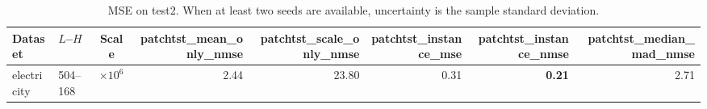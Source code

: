 \begin{table}[htbp]
\centering
\caption{MSE on test2. When at least two seeds are available, uncertainty is the sample standard deviation.}
\begin{tabular}{llcrrrrr}
\toprule
Dataset & $L$--$H$ & Scale & patchtst\_mean\_only\_nmse & patchtst\_scale\_only\_nmse & patchtst\_instance\_mse & patchtst\_instance\_nmse & patchtst\_median\_mad\_nmse \\
\midrule
electricity & 504--168 & $\times 10^{6}$ & 2.44 & 23.80 & 0.31 & \textbf{0.21} & 2.71 \\
\bottomrule
\end{tabular}
\end{table}
